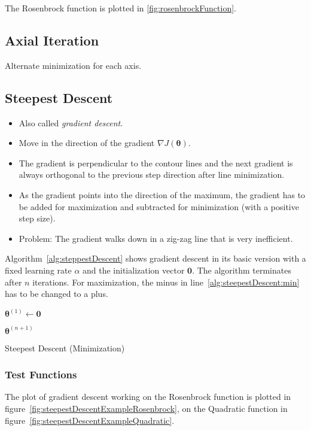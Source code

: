 \documentclass[a4paper, 11pt, accentcolor = tud3b]{tudreport}
\renewcommand{\vec}[1]{\mathbf{#1}}
\begin{document}
					The Rosenbrock function is plotted in \ref{fig:rosenbrockFunction}.

			\subsection{Axial Iteration}
				Alternate minimization for each axis.

			\subsection{Steepest Descent}
				\begin{itemize}
					\item Also called \emph{gradient descent}.
					\item Move in the direction of the gradient \( \nabla J(\vec{\theta}) \).
					\item The gradient is perpendicular to the contour lines and the next gradient is always orthogonal to the previous step direction after line minimization.
					\item As the gradient points into the direction of the maximum, the gradient has to be added for maximization and subtracted for minimization (with a positive step size).
					\item Problem: The gradient walks down in a zig-zag line that is very inefficient.
				\end{itemize}

				Algorithm~\ref{alg:steppestDescent} shows gradient descent in its basic version with a fixed learning rate \(\alpha\) and the initialization vector \(\vec{0}\). The algorithm terminates after \(n\) iterations. For maximization, the minus in line~\ref{alg:steepestDescent:min} has to be changed to a plus.

				\begin{algorithm}
					\(\vec{\theta}^{(1)} \gets \vec{0} \)

					\For{\( i = 1, \cdots, n \)}{
						\( \vec{\theta}^{(i + 1)} \gets \vec{\theta}^{(i)} - \alpha \nabla_{\vec{\theta}} J(\vec{\theta}) \) \label{alg:steepestDescent:min}
					}

					\Return \(\vec{\theta}^{(n + 1)}\)

					\caption{Steepest Descent (Minimization)}
					\label{alg:steppestDescent}
				\end{algorithm}

				\subsubsection{Test Functions}
					The plot of gradient descent working on the Rosenbrock function is plotted in figure~\ref{fig:steepestDescentExampleRosenbrock}, on the Quadratic function in figure~\ref{fig:steepestDescentExampleQuadratic}.
\end{document}
